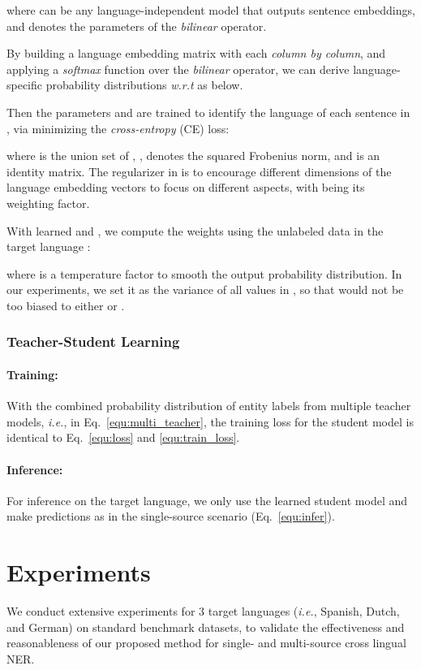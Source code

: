 \documentclass[11pt,a4paper]{article}
\newcommand\ie{\textit{i.e.}}
\newcommand\wrt{\textit{w.r.t}}
\begin{document}
	where  can be any language-independent model that outputs sentence embeddings, and  denotes the parameters of the \textit{bilinear} operator. 
	
	By building a language embedding matrix  with each  \textit{column by column}, and applying a \textit{softmax} function over the \textit{bilinear} operator, we can derive language-specific probability distributions \wrt{}  as below.
	
Then the parameters  and  are trained to identify the language of each sentence in , via minimizing the \textit{cross-entropy} (CE) loss:

	where  is the union set of , ,  denotes the squared Frobenius norm, and  is an identity matrix. The regularizer in  is to encourage different dimensions of the language embedding vectors to focus on different aspects, with  being its weighting factor.
	
	With learned  and , we compute the weights  using the unlabeled data in the target language :
	
	where  is a temperature factor to smooth the output probability distribution. 
	In our experiments, we set it as the variance of all values in , so that  would not be too biased to either  or . 


	\subsubsection{Teacher-Student Learning}
	\paragraph{Training: } With the combined probability distribution of entity labels from multiple teacher models, \ie,  in Eq.~\ref{equ:multi_teacher}, the training loss for the student model is identical to Eq.~\ref{equ:loss} and \ref{equ:train_loss}.


	\paragraph{Inference: } For inference on the target language, we only use the learned student model and make predictions as in the single-source scenario (Eq.~\ref{equ:infer}).
	
	
	
	\section{Experiments}
	\label{sec:expt}
	We conduct extensive experiments for 3 target languages (\ie, Spanish, Dutch, and German) on standard benchmark datasets, to validate the effectiveness and reasonableness of our proposed method for single- and multi-source cross lingual NER. 
\end{document}
